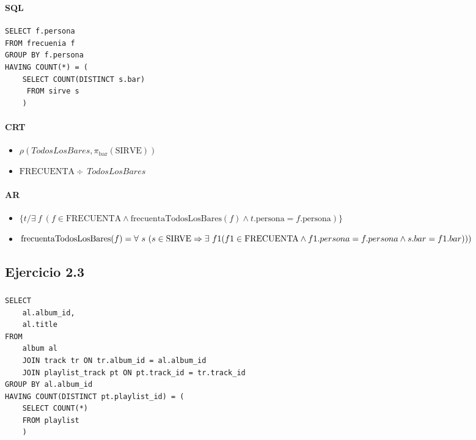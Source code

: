 \subsubsection{}
\paragraph{SQL}
\begin{verbatim}
SELECT f.persona
FROM frecuenia f
GROUP BY f.persona
HAVING COUNT(*) = (
	SELECT COUNT(DISTINCT s.bar)
	 FROM sirve s
	)
\end{verbatim}


\paragraph{CRT}
\begin{itemize}
	\item[] $\rho(TodosLosBares, \pi_{\text{bar}}(\text{SIRVE}))$
	\item[] $\text{FRECUENTA} \div~TodosLosBares$
\end{itemize}

\paragraph{AR}
\begin{itemize}
	\item[] $\{ t / \exists~ f~ (f\in\text{FRECUENTA} \land \text{frecuentaTodosLosBares}(f) \land t.\text{persona} = f.\text{persona})\} $
	
	\item[] $\text{frecuentaTodosLosBares}(f) = \forall~ s~(s\in\text{SIRVE} \Rightarrow \\ \exists~f1 (f1\in\text{FRECUENTA} \land f1.persona = f.persona \land s.bar = f1.bar)))$
\end{itemize}

\subsection{Ejercicio 2.3}
\subsubsection{}
\begin{verbatim}
SELECT
	al.album_id,
	al.title
FROM
	album al
	JOIN track tr ON tr.album_id = al.album_id
	JOIN playlist_track pt ON pt.track_id = tr.track_id
GROUP BY al.album_id
HAVING COUNT(DISTINCT pt.playlist_id) = (
	SELECT COUNT(*) 
	FROM playlist
	)	
\end{verbatim}

